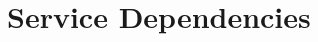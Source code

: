 \documentclass[a4paper,twoside]{report} %
\begin{document}




\chapter{Service Dependencies}\label{chap:dependencies}
\end{document}
